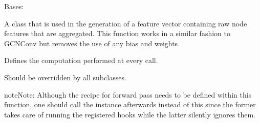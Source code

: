 \documentclass[letterpaper,10pt,english]{sphinxmanual}
\begin{document}

\begin{fulllineitems}
\label{\detokenize{modules/gqcml.torchgeom_interface:gqcml.torchgeom_interface.auto_encoder.Neighbourhood_Aggregator}}
Bases: 

A class that is used in the generation of a feature vector containing
raw node features that are aggregated. This function works in a similar
fashion to GCNConv but removes the use of any bias and weights.

\begin{fulllineitems}
\label{\detokenize{modules/gqcml.torchgeom_interface:gqcml.torchgeom_interface.auto_encoder.Neighbourhood_Aggregator.forward}}
Defines the computation performed at every call.

Should be overridden by all subclasses.

\begin{sphinxadmonition}{note}{Note:}
Although the recipe for forward pass needs to be defined within
this function, one should call the  instance afterwards
instead of this since the former takes care of running the
registered hooks while the latter silently ignores them.
\end{sphinxadmonition}

\end{fulllineitems}



\end{fulllineitems}
\end{document}
